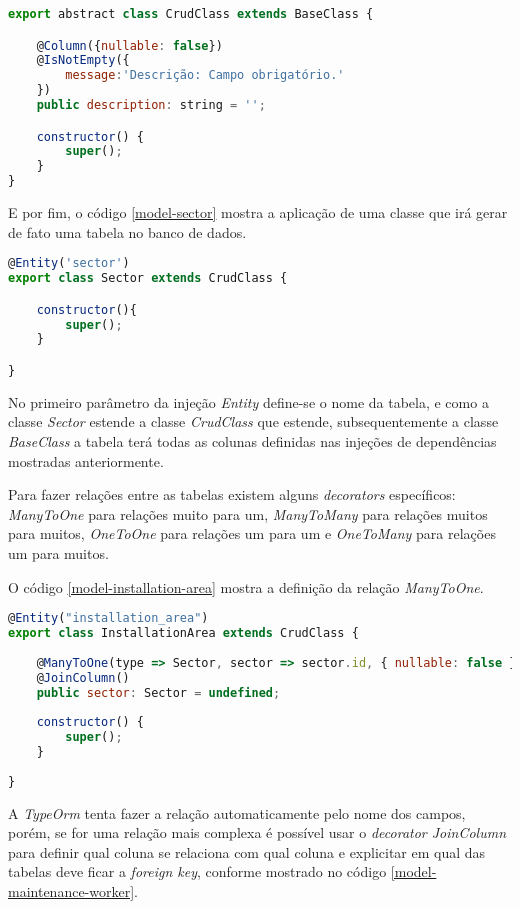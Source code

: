 \begin{lstlisting}[language=JavaScript, caption={CrudClass: Mapeamento de propriedades para cruds genéricos}, label={typeorm-crud-class}]
export abstract class CrudClass extends BaseClass {

	@Column({nullable: false})
	@IsNotEmpty({
		message:'Descrição: Campo obrigatório.'
	})
	public description: string = '';

	constructor() {
		super();
	}
}
\end{lstlisting}

E por fim, o código \ref{model-sector} mostra a aplicação de uma classe que irá gerar de fato uma tabela no banco de dados.

\begin{lstlisting}[language=JavaScript, caption={Mapeamento de propriedades da tabela sector}, label={model-sector}]
@Entity('sector')
export class Sector extends CrudClass {

	constructor(){
		super();
	}

}
\end{lstlisting}

No primeiro parâmetro da injeção \textit{Entity} define-se o nome da tabela, e como a classe \textit{Sector} estende a classe \textit{CrudClass} que estende, subsequentemente a classe \textit{BaseClass} a tabela terá todas as colunas definidas nas injeções de dependências mostradas anteriormente.

Para fazer relações entre as tabelas existem alguns \textit{decorators} específicos: \textit{ManyToOne} para relações muito para um, \textit{ManyToMany} para relações muitos para muitos, \textit{OneToOne} para relações um para um e \textit{OneToMany} para relações um para muitos.

O código \ref{model-installation-area} mostra a definição da relação \textit{ManyToOne}.

\begin{lstlisting}[language=JavaScript, caption={Mapeamento de propriedades da tabela área de installation\_area}, label={model-installation-area}]
@Entity("installation_area")
export class InstallationArea extends CrudClass {
	
	@ManyToOne(type => Sector, sector => sector.id, { nullable: false })
	@JoinColumn()
	public sector: Sector = undefined;
	
	constructor() {
		super();
	}
	
}
\end{lstlisting}

A \textit{TypeOrm} tenta fazer a relação automaticamente pelo nome dos campos, porém, se for uma relação mais complexa é possível usar o \textit{decorator JoinColumn} para definir qual coluna se relaciona com qual coluna e explicitar em qual das tabelas deve ficar a \textit{foreign key}, conforme mostrado no código \ref{model-maintenance-worker}.

